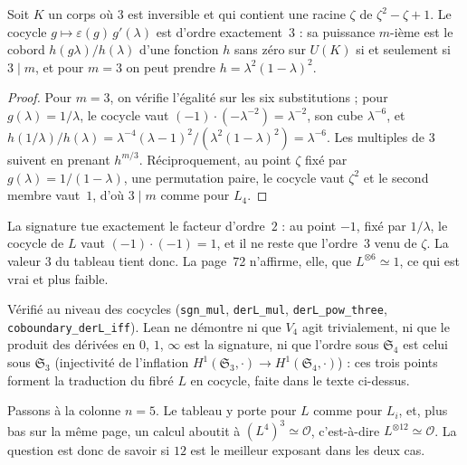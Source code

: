 \begin{encadre}
\begin{theoreme}[Grothendieck, page 70, colonne $n = 4$, pour $L$\piste{146-equivariant-trivialising-exponents}]\label{thm:146-trois}
Soit $K$ un corps où $3$ est inversible et qui contient une racine $\zeta$ de $\zeta^2 - \zeta + 1$. Le cocycle $g \mapsto \varepsilon(g)\,g'(\lambda)$ est d'ordre exactement~$3$ : sa puissance $m$-ième est le cobord $h(g\lambda)/h(\lambda)$ d'une fonction $h$ sans zéro sur $U(K)$ si et seulement si $3 \mid m$, et pour $m = 3$ on peut prendre $h = \lambda^2(1 - \lambda)^2$.
\end{theoreme}
\end{encadre}

\begin{proof}
Pour $m = 3$, on vérifie l'égalité sur les six substitutions ; pour $g(\lambda) = 1/\lambda$, le cocycle vaut $(-1)\cdot(-\lambda^{-2}) = \lambda^{-2}$, son cube $\lambda^{-6}$, et $h(1/\lambda)/h(\lambda) = \lambda^{-4}(\lambda - 1)^2/(\lambda^2(1 - \lambda)^2) = \lambda^{-6}$. Les multiples de $3$ suivent en prenant $h^{m/3}$. Réciproquement, au point $\zeta$ fixé par $g(\lambda) = 1/(1 - \lambda)$, une permutation paire, le cocycle vaut $\zeta^2$ et le second membre vaut~$1$, d'où $3 \mid m$ comme pour $L_4$.
\end{proof}

La signature tue exactement le facteur d'ordre~$2$ : au point $-1$, fixé par $1/\lambda$, le cocycle de $L$ vaut $(-1)\cdot(-1) = 1$, et il ne reste que l'ordre~$3$ venu de $\zeta$. La valeur $3$ du tableau tient donc. La page~72 n'affirme, elle, que $L^{\otimes 6} \simeq 1$, ce qui est vrai et plus faible.

\noindent Vérifié au niveau des cocycles (\texttt{sgn\_mul}, \texttt{derL\_mul}, \texttt{derL\_pow\_three}, \texttt{coboundary\_derL\_iff}). Lean ne démontre ni que $V_4$ agit trivialement, ni que le produit des dérivées en $0$, $1$, $\infty$ est la signature, ni que l'ordre sous $\mathfrak S_4$ est celui sous $\mathfrak S_3$ (injectivité de l'inflation $H^1(\mathfrak S_3, \cdot) \to H^1(\mathfrak S_4, \cdot)$) : ces trois points forment la traduction du fibré $L$ en cocycle, faite dans le texte ci-dessus.

Passons à la colonne $n = 5$. Le tableau y porte  pour $L$ comme pour $L_i$, et, plus bas sur la même page, un calcul aboutit à $(L^4)^3 \simeq \mathcal O$, c'est-à-dire $L^{\otimes 12} \simeq \mathcal O$. La question est donc de savoir si $12$ est le meilleur exposant dans les deux cas.

